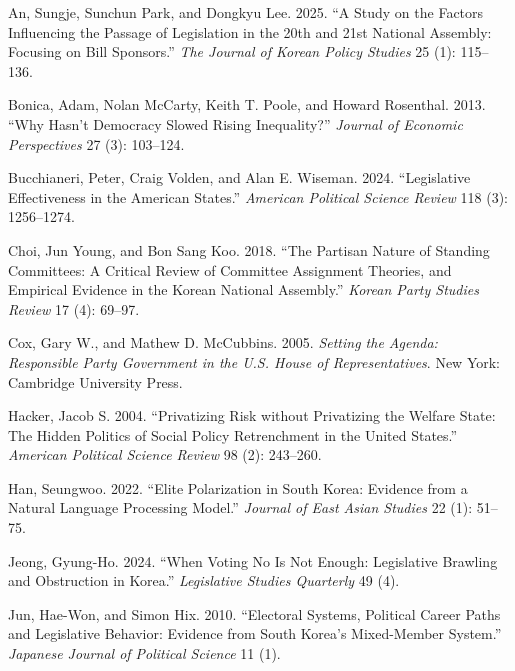 \documentclass[11pt]{article}
\begin{document}
\begin{description}

\item An, Sungje, Sunchun Park, and Dongkyu Lee. 2025. ``A Study on the Factors Influencing the Passage of Legislation in the 20th and 21st National Assembly: Focusing on Bill Sponsors.'' \textit{The Journal of Korean Policy Studies} 25 (1): 115--136.

\item Bonica, Adam, Nolan McCarty, Keith T. Poole, and Howard Rosenthal. 2013. ``Why Hasn't Democracy Slowed Rising Inequality?'' \textit{Journal of Economic Perspectives} 27 (3): 103--124.

\item Bucchianeri, Peter, Craig Volden, and Alan E. Wiseman. 2024. ``Legislative Effectiveness in the American States.'' \textit{American Political Science Review} 118 (3): 1256--1274.

\item Choi, Jun Young, and Bon Sang Koo. 2018. ``The Partisan Nature of Standing Committees: A Critical Review of Committee Assignment Theories, and Empirical Evidence in the Korean National Assembly.'' \textit{Korean Party Studies Review} 17 (4): 69--97.

\item Cox, Gary W., and Mathew D. McCubbins. 2005. \textit{Setting the Agenda: Responsible Party Government in the U.S. House of Representatives}. New York: Cambridge University Press.

\item Hacker, Jacob S. 2004. ``Privatizing Risk without Privatizing the Welfare State: The Hidden Politics of Social Policy Retrenchment in the United States.'' \textit{American Political Science Review} 98 (2): 243--260.

\item Han, Seungwoo. 2022. ``Elite Polarization in South Korea: Evidence from a Natural Language Processing Model.'' \textit{Journal of East Asian Studies} 22 (1): 51--75.

\item Jeong, Gyung-Ho. 2024. ``When Voting No Is Not Enough: Legislative Brawling and Obstruction in Korea.'' \textit{Legislative Studies Quarterly} 49 (4).

\item Jun, Hae-Won, and Simon Hix. 2010. ``Electoral Systems, Political Career Paths and Legislative Behavior: Evidence from South Korea's Mixed-Member System.'' \textit{Japanese Journal of Political Science} 11 (1).


\end{description}
\end{document}
